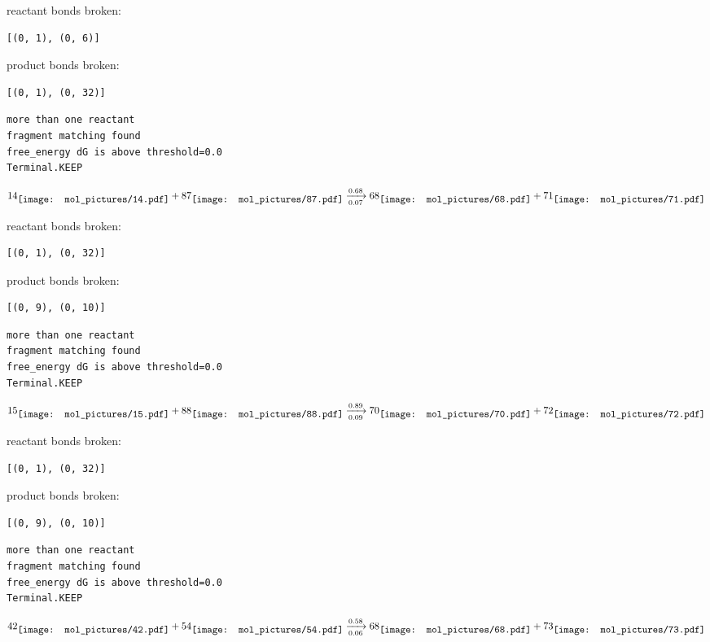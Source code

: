 \documentclass{article}
\begin{document}
reactant bonds broken:\begin{verbatim}
[(0, 1), (0, 6)]
\end{verbatim}
product bonds broken:\begin{verbatim}
[(0, 1), (0, 32)]
\end{verbatim}




\vspace{1cm}
\begin{verbatim}
more than one reactant
fragment matching found
free_energy dG is above threshold=0.0
Terminal.KEEP
\end{verbatim}
$$
14
\raisebox{-.5\height}{\texttt{[image: mol\_pictures/14.pdf]}}
+
87
\raisebox{-.5\height}{\texttt{[image: mol\_pictures/87.pdf]}}
\xrightarrow[0.07]{0.68}
68
\raisebox{-.5\height}{\texttt{[image: mol\_pictures/68.pdf]}}
+
71
\raisebox{-.5\height}{\texttt{[image: mol\_pictures/71.pdf]}}
$$


reactant bonds broken:\begin{verbatim}
[(0, 1), (0, 32)]
\end{verbatim}
product bonds broken:\begin{verbatim}
[(0, 9), (0, 10)]
\end{verbatim}




\vspace{1cm}
\begin{verbatim}
more than one reactant
fragment matching found
free_energy dG is above threshold=0.0
Terminal.KEEP
\end{verbatim}
$$
15
\raisebox{-.5\height}{\texttt{[image: mol\_pictures/15.pdf]}}
+
88
\raisebox{-.5\height}{\texttt{[image: mol\_pictures/88.pdf]}}
\xrightarrow[0.09]{0.89}
70
\raisebox{-.5\height}{\texttt{[image: mol\_pictures/70.pdf]}}
+
72
\raisebox{-.5\height}{\texttt{[image: mol\_pictures/72.pdf]}}
$$


reactant bonds broken:\begin{verbatim}
[(0, 1), (0, 32)]
\end{verbatim}
product bonds broken:\begin{verbatim}
[(0, 9), (0, 10)]
\end{verbatim}




\vspace{1cm}
\begin{verbatim}
more than one reactant
fragment matching found
free_energy dG is above threshold=0.0
Terminal.KEEP
\end{verbatim}
$$
42
\raisebox{-.5\height}{\texttt{[image: mol\_pictures/42.pdf]}}
+
54
\raisebox{-.5\height}{\texttt{[image: mol\_pictures/54.pdf]}}
\xrightarrow[0.06]{0.58}
68
\raisebox{-.5\height}{\texttt{[image: mol\_pictures/68.pdf]}}
+
73
\raisebox{-.5\height}{\texttt{[image: mol\_pictures/73.pdf]}}
$$
\end{document}
